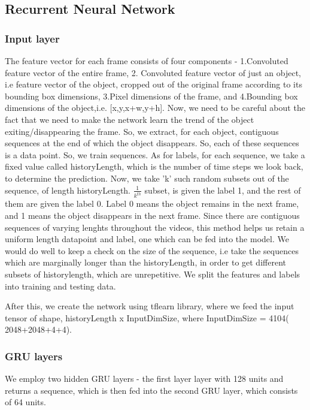 \documentclass[journal]{IEEEtran}
\begin{document}
\subsection{Recurrent Neural Network}

\subsubsection{Input layer}
The feature vector for each frame consists of four components - 1.Convoluted feature vector of the entire frame, 2. Convoluted feature vector of just an object, i.e feature vector of the object, cropped out of the original frame according to its bounding box dimensions, 3.Pixel dimensions of the frame, and 4.Bounding box dimensions of the object,i.e. [x,y,x+w,y+h]. Now, we need to be careful about the fact that we need to make the network learn the trend of the object exiting/disappearing the frame. So, we extract, for each object, contiguous sequences at the end of which the object disappears. So, each of these sequences is a data point. So, we train sequences. As for labels, for each sequence, we take a fixed value called historyLength, which is the number of time steps we look back, to determine the prediction. Now, we take 'k' such random subsets out of the sequence, of length historyLength. $\frac{1}{k^{th}}$ subset, is given the label 1, and the rest of them are given the label 0. Label 0 means the object remains in the next frame, and 1 means the object disappears in the next frame. Since there are contiguous sequences of varying lenghts throughout the videos, this method helps us retain a uniform length datapoint and label, one which can be fed into the model. We would do well to keep a check on the size of the sequence, i.e take the sequences which are marginally longer than the historyLength, in order to get different subsets of historylength, which are unrepetitive. We split the features and labels into training and testing data.

After this, we create the network using tflearn library, where we feed the input tensor of shape, historyLength x InputDimSize, where InputDimSize = 4104( 2048+2048+4+4).

\subsubsection{GRU layers}
We employ two hidden GRU layers - the first layer layer with 128 units and returns a sequence, which is then fed into the second GRU layer, which consists of 64 units.
\end{document}
